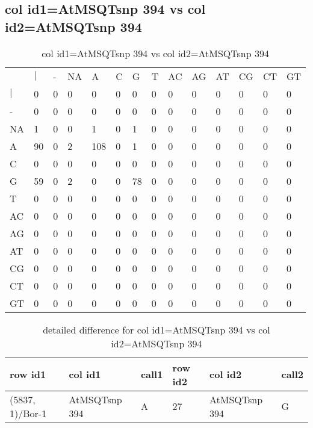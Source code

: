 \subsection{col id1=AtMSQTsnp 394 vs col id2=AtMSQTsnp 394}
\begin{center}
\begin{longtable}{|l|l|l|l|l|l|l|l|l|l|l|l|l|l|}
\caption{col id1=AtMSQTsnp 394 vs col id2=AtMSQTsnp 394} \label{table_dm906}\\
\hline
\\
\hline
&$|$&-&NA&A&C&G&T&AC&AG&AT&CG&CT&GT\\
$|$&0&0&0&0&0&0&0&0&0&0&0&0&0\\
-&0&0&0&0&0&0&0&0&0&0&0&0&0\\
NA&1&0&0&1&0&1&0&0&0&0&0&0&0\\
A&90&0&2&108&0&1&0&0&0&0&0&0&0\\
C&0&0&0&0&0&0&0&0&0&0&0&0&0\\
G&59&0&2&0&0&78&0&0&0&0&0&0&0\\
T&0&0&0&0&0&0&0&0&0&0&0&0&0\\
AC&0&0&0&0&0&0&0&0&0&0&0&0&0\\
AG&0&0&0&0&0&0&0&0&0&0&0&0&0\\
AT&0&0&0&0&0&0&0&0&0&0&0&0&0\\
CG&0&0&0&0&0&0&0&0&0&0&0&0&0\\
CT&0&0&0&0&0&0&0&0&0&0&0&0&0\\
GT&0&0&0&0&0&0&0&0&0&0&0&0&0\\
\hline
\end{longtable}
\end{center}

\begin{center}
\begin{longtable}{|l|l|l|l|l|l|}
\caption{detailed difference for col id1=AtMSQTsnp 394 vs col id2=AtMSQTsnp 394} \label{table_dm907}\\
\hline
row id1&col id1&call1&row id2&col id2&call2\\
\hline
(5837, 1)/Bor-1&AtMSQTsnp 394&A&27&AtMSQTsnp 394&G\\
\hline
\end{longtable}
\end{center}

